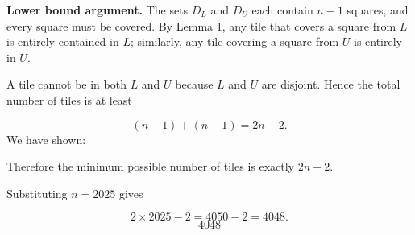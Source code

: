 \textbf{Lower bound argument.} The sets \(D_L\) and \(D_U\) each contain \(n-1\) squares, and every square must be covered. By Lemma 1, any tile that covers a square from \(L\) is entirely contained in \(L\); similarly, any tile covering a square from \(U\) is entirely in \(U\).\par
{}
A tile cannot be in both \(L\) and \(U\) because \(L\) and \(U\) are disjoint. Hence the total number of tiles is at least\par
\[
(n-1) + (n-1) = 2n-2.
\]
\smallskip
{}
We have shown:\par
{}
Therefore the minimum possible number of tiles is exactly \(2n-2\).\par
Substituting \(n = 2025\) gives\par
\[
2 \times 2025 - 2 = 4050 - 2 = 4048.
\]
\[
\boxed{4048}
\]
\par
